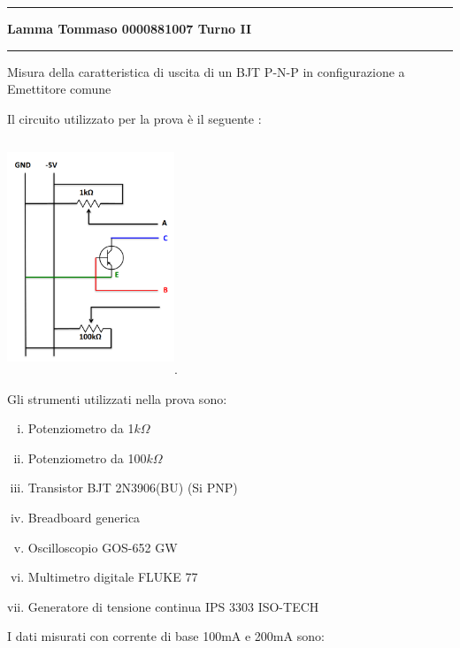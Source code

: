 \documentclass{amsart}
\begin{document}
    \hrule
    \begin{center}
        \textbf{ Lamma    Tommaso    0000881007        Turno    II }\\
    \end{center}
    \hrule
    \begin{center}
        {\huge Misura della caratteristica di uscita di un BJT P-N-P in configurazione a Emettitore comune}
    \end{center}
    Il circuito utilizzato per la prova è il seguente :
    \begin{center}
        \includegraphics[width = 5cm, height = 7cm]{circuito.png}.
    \end{center}
    Gli strumenti utilizzati nella prova sono:
    \begin{enumerate}[(i)]
        \item Potenziometro da 1$k\Omega$
        \item Potenziometro da 100$k\Omega$
        \item Transistor BJT 2N3906(BU) (Si PNP) 
        \item Breadboard generica
        \item Oscilloscopio GOS-652 GW
        \item Multimetro digitale FLUKE 77
        \item Generatore di tensione continua IPS 3303 ISO-TECH
    \end{enumerate}
    \newpage
    I dati misurati con corrente di base 100mA e 200mA sono:\\
    \hfill \\
\end{document}
